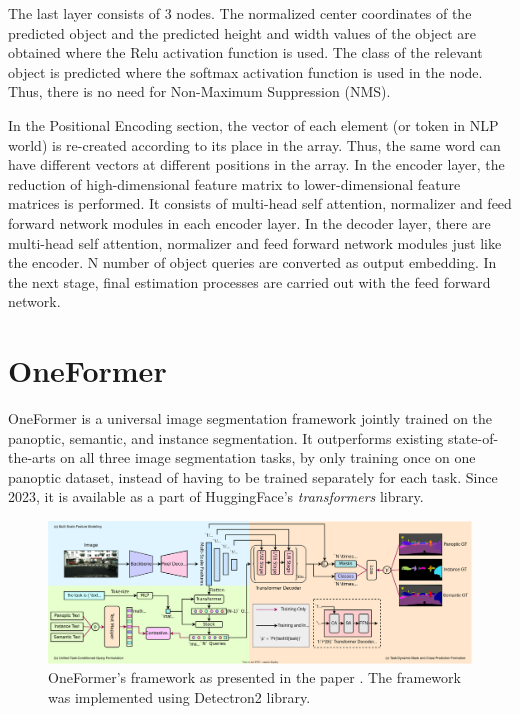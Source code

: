 The last layer consists of 3 nodes. The normalized center coordinates of the predicted object and the predicted height and width values of the object are obtained where the Relu activation function is used. The class of the relevant object is predicted where the softmax activation function is used in the node. Thus, there is no need for Non-Maximum Suppression (NMS).

In the Positional Encoding section, the vector of each element (or token in NLP world) is re-created according to its place in the array. Thus, the same word can have different vectors at different positions in the array.
In the encoder layer, the reduction of high-dimensional feature matrix to lower-dimensional feature matrices is performed. It consists of multi-head self attention, normalizer and feed forward network modules in each encoder layer.
In the decoder layer, there are multi-head self attention, normalizer and feed forward network modules just like the encoder. N number of object queries are converted as output embedding. In the next stage, final estimation processes are carried out with the feed forward network.



\section{OneFormer}
OneFormer \cite{jain2023oneformer} is a universal image segmentation framework jointly trained on the panoptic, semantic, and instance segmentation. It outperforms existing state-of-the-arts on all three image segmentation tasks, by only training once on one panoptic dataset, instead of having to be trained separately for each task. Since 2023, it is available as a part of HuggingFace's \textit{transformers} \cite{huggingface-transformers} library.

\begin{figure}[ht]
    \centering
    \includegraphics[width=1.0\textwidth]{img/oneformer.png}
    \caption{OneFormer's framework as presented in the paper \cite{jain2023oneformer}. The framework was implemented using Detectron2 \cite{wu2019detectron2} library. }
    \label{fig:oneformer-framework}
\end{figure}


